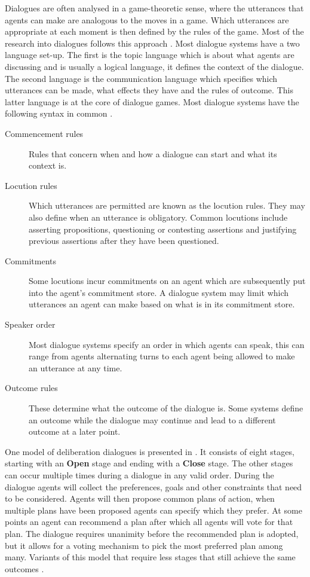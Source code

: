 \documentclass[a4paper]{article}
\begin{document}
Dialogues are often analysed in a game-theoretic sense, where the utterances
that agents can make are analogous to the moves in a game. Which utterances are
appropriate at each moment is then defined by the rules of the game. Most of
the research into dialogues follows this approach
\cite{prakken2006,prakken2009}. Most dialogue systems have a two language
set-up. The first is the topic language which is about what agents are
discussing and is usually a logical language, it defines the context of the
dialogue. The second language is the communication language which specifies
which utterances can be made, what effects they have and the rules of outcome.
This latter language is at the core of dialogue games. Most dialogue systems
have the following syntax in common \cite{prakken2006,prakken2009,mcburney2009}.
\begin{description}
	\item[Commencement rules] Rules that concern when and how a dialogue can
	start and what its context is.
	\item[Locution rules] Which utterances are permitted are known as the
	locution rules. They may also define when an utterance is obligatory.
	Common locutions include asserting propositions, questioning or contesting
	assertions and justifying previous assertions after they have been
	questioned.
	\item[Commitments] Some locutions incur commitments on an agent which are
	subsequently put into the agent's commitment store. A dialogue system may
	limit which utterances an agent can make based on what is in its commitment
	store.
	\item[Speaker order] Most dialogue systems specify an order in which agents
	can speak, this can range from agents alternating turns to each agent being
	allowed to make an utterance at any time.
	\item[Outcome rules] These determine what the outcome of the dialogue is.
	Some systems define an outcome while the dialogue may continue and lead to
	a different outcome at a later point.
\end{description}

One model of deliberation dialogues is presented in \cite{mcburney2007}. It
consists of eight stages, starting with an \textbf{Open} stage and ending with
a \textbf{Close} stage. The other stages can occur multiple times during a
dialogue in any valid order. During the dialogue agents will collect the
preferences, goals and other constraints that need to be considered. Agents
will then propose common plans of action, when multiple plans have been
proposed agents can specify which they prefer. At some points an agent can
recommend a plan after which all agents will vote for that plan. The dialogue
requires unanimity before the recommended plan is adopted, but it allows for a
voting mechanism to pick the most preferred plan among many. Variants of this 
model that require less stages that still achieve the same outcomes 
\cite{dunin-keplicz2011}.
\end{document}
